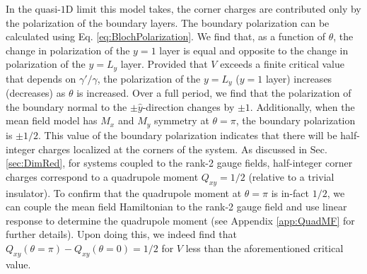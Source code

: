 \documentclass[prb,aps,twocolumn,groupaddress,floatfix]{revtex4-1}
\begin{document}
In the quasi-$1$D limit this model takes, the corner charges are contributed only by the polarization of the boundary layers. The boundary polarization can be calculated using Eq. \ref{eq:BlochPolarization}. We find that, as a function of $\theta$, the change in polarization of the $y=1$ layer is equal and opposite to the change in polarization of the $y = L_y$ layer. Provided that $V$ exceeds a finite critical value that depends on $\gamma'/\gamma$, the polarization of the $y = L_y$ ($y=1$ layer) increases (decreases) as $\theta$ is increased. Over a full period, we find that the polarization of the boundary normal to the $\pm \hat{y}$-direction changes by $\pm 1$. Additionally, when the mean field model has $M_x$ and $M_y$ symmetry at $\theta = \pi$, the boundary polarization is $\pm 1/2$. This value of the boundary polarization indicates that there will be half-integer charges localized at the corners of the system. As discussed in Sec. \ref{sec:DimRed}, for systems coupled to the rank-2 gauge fields, half-integer corner charges correspond to a quadrupole moment $Q_{xy} = 1/2$ (relative to a trivial insulator). To confirm that the quadrupole moment at $\theta = \pi$ is in-fact $1/2$, we can couple the mean field Hamiltonian to the rank-2 gauge field and use linear response to determine the quadrupole moment (see Appendix \ref{app:QuadMF} for further details). Upon doing this, we indeed find that $Q_{xy}(\theta = \pi) - Q_{xy}(\theta = 0) = 1/2$ for $V$ less than the aforementioned critical value. 
\end{document}
